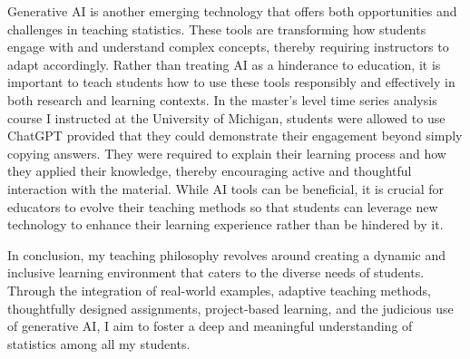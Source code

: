 \documentclass{article}
\begin{document}
Generative AI is another emerging technology that offers both opportunities and challenges in teaching statistics.
These tools are transforming how students engage with and understand complex concepts, thereby requiring instructors to adapt accordingly.
Rather than treating AI as a hinderance to education, it is important to teach students how to use these tools responsibly and effectively in both research and learning contexts.
In the master's level time series analysis course I instructed at the University of Michigan, students were allowed to use ChatGPT provided that they could demonstrate their engagement beyond simply copying answers.
They were required to explain their learning process and how they applied their knowledge, thereby encouraging active and thoughtful interaction with the material.
While AI tools can be beneficial, it is crucial for educators to evolve their teaching methods so that students can leverage new technology to enhance their learning experience rather than be hindered by it.

In conclusion, my teaching philosophy revolves around creating a dynamic and inclusive learning environment that caters to the diverse needs of students.
Through the integration of real-world examples, adaptive teaching methods, thoughtfully designed assignments, project-based learning, and the judicious use of generative AI, I aim to foster a deep and meaningful understanding of statistics among all my students.



\end{document}
